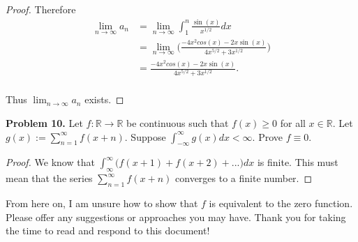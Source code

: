 \documentclass[12pt]{article}
\begin{document}
\begin{flushleft}
\begin{proof}
Therefore \begin{align*}
\lim_{n \to \infty} a_{n} &= \lim_{n \to \infty} \int_{1}^{n} \frac{\sin(x)}{x^{1/2}}dx \\
				  &= \lim_{n \to \infty} \big( \frac{-4x^{2}cos(x)-2x\sin(x)}{4x^{5/2}+3x^{1/2}} \big) \\
				  &=\frac{-4x^{2}cos(x)-2x\sin(x)}{4x^{5/2}+3x^{1/2}}. \\
\end{align*}

Thus $\lim_{n \to \infty} a_{n}$ exists. 	    
\end{proof}

\vspace{.2cm}

\textbf{Problem 10.} Let $f: \mathbb{R} \rightarrow \mathbb{R}$ be continuous such that $f(x)\geq 0$ for all $x \in \mathbb{R}$. Let $g(x):= \sum_{n=1}^{\infty} f(x+n)$. Suppose
$\int_{-\infty}^{\infty} g(x)dx< \infty$. Prove $f \equiv 0$. 

\vspace{.2cm}

\begin{proof}

We know that $\int_{\infty}^{\infty} \big( f(x+1)+f(x+2)+...\big)dx$ is finite. This must mean that the series $\sum_{n=1}^{\infty} f(x+n)$ converges to a finite number.

\end{proof}

\color{red} From here on, I am unsure how to show that $f$ is equivalent to the zero function. Please offer any suggestions or approaches you may have. Thank you for taking the time to read and respond to this document!

\end{flushleft}
\end{document}
